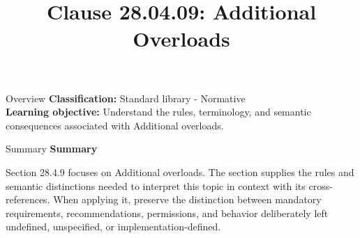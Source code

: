 \documentclass[10pt,letterpaper]{article}
\title{Clause 28.04.09: Additional Overloads}
\author{}
\date{}
\begin{document}
\maketitle
\begin{CornellOverviewBox}{Overview}
\textbf{Classification:} Standard library - Normative\\[2pt]
\textbf{Learning objective:} Understand the rules, terminology, and semantic consequences associated with Additional overloads.
\end{CornellOverviewBox}\begin{CornellSummaryBox}{Summary}
{\sffamily\bfseries\color{Accent} Summary}\par\vspace{3pt}Section 28.4.9 focuses on Additional overloads. The section supplies the rules and semantic distinctions needed to interpret this topic in context with its cross-references. When applying it, preserve the distinction between mandatory requirements, recommendations, permissions, and behavior deliberately left undefined, unspecified, or implementation-defined.
\end{CornellSummaryBox}
\end{document}
